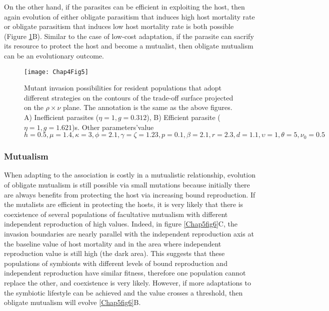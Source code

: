 \documentclass[11.5pt]{article}
\begin{document}
\medskip

On the other hand, if the parasites can be efficient in exploiting the host, then again evolution of either obligate parasitism that induces high host mortality rate or obligate parasitism that induces low host mortality rate is both possible (Figure \ref{Chap5fig5}B). Similar to the case of low-cost adaptation, if the parasite can sacrify its resource to protect the host and become a mutualist, then obligate mutualism can be an evolutionary outcome.

\begin{figure} [H]
    \centering
    \texttt{[image: Chap4Fig5]}
    \caption[Evolutionary trajectories in case of high-cost adaptation in parasitism]{Mutant invasion possibilities for resident populations that adopt different strategies on the contours of the trade-off surface projected on the $\rho \times \nu$ plane. The annotation is the same as the above figures. A) Inefficient parasites ($\eta=1, g=0.312$), B) Efficient parasite ($\eta=1, g=1.621$)s. Other parameters'value $h=0.5, \mu=1.4, \kappa=3, \phi=2.1, \gamma=\zeta=1.23, p=0.1, \beta=2.1, r=2.3, d=1.1, \upsilon=1, \theta=5, \nu_0=0.5$}
    \label{Chap5fig5}
\end{figure}

\subsubsection*{Mutualism}
When adapting to the association is costly in a mutualistic relationship, evolution of obligate mutualism is still possible via small mutations because initially there are always benefits from protecting the host via increasing bound reproduction. If the mutalists are efficient in protecting the hosts, it is very likely that there is coexistence of several populations of facultative mutualism with different independent reproduction of high values. Indeed, in figure \ref{Chap5fig6}C, the invasion boundaries are nearly parallel with the independent reproduction axis at the baseline value of host mortality and in the area where independent reproduction value is still high (the dark area). This suggests that these populations of symbionts with different levels of bound reproduction and independent reproduction have similar fitness, therefore one population cannot replace the other, and coexistence is very likely. However, if more adaptations to the symbiotic lifestyle can be achieved and the value crosses a threshold, then obligate mutualism will evolve \ref{Chap5fig6}B. 
\end{document}
